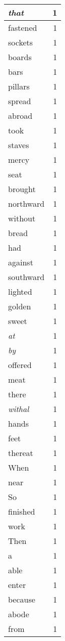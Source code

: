 \begin{center}
\begin{longtable}{l|r}
\emph{that} & 1 \\ \hline
fastened & 1 \\ \hline
sockets & 1 \\ \hline
boards & 1 \\ \hline
bars & 1 \\ \hline
pillars & 1 \\ \hline
spread & 1 \\ \hline
abroad & 1 \\ \hline
took & 1 \\ \hline
staves & 1 \\ \hline
mercy & 1 \\ \hline
seat & 1 \\ \hline
brought & 1 \\ \hline
northward & 1 \\ \hline
without & 1 \\ \hline
bread & 1 \\ \hline
had & 1 \\ \hline
against & 1 \\ \hline
southward & 1 \\ \hline
lighted & 1 \\ \hline
golden & 1 \\ \hline
sweet & 1 \\ \hline
\emph{at} & 1 \\ \hline
\emph{by} & 1 \\ \hline
offered & 1 \\ \hline
meat & 1 \\ \hline
there & 1 \\ \hline
\emph{withal} & 1 \\ \hline
hands & 1 \\ \hline
feet & 1 \\ \hline
thereat & 1 \\ \hline
When & 1 \\ \hline
near & 1 \\ \hline
So & 1 \\ \hline
finished & 1 \\ \hline
work & 1 \\ \hline
Then & 1 \\ \hline
a & 1 \\ \hline
able & 1 \\ \hline
enter & 1 \\ \hline
because & 1 \\ \hline
abode & 1 \\ \hline
from & 1 \\ \hline

\end{longtable}
\end{center}
